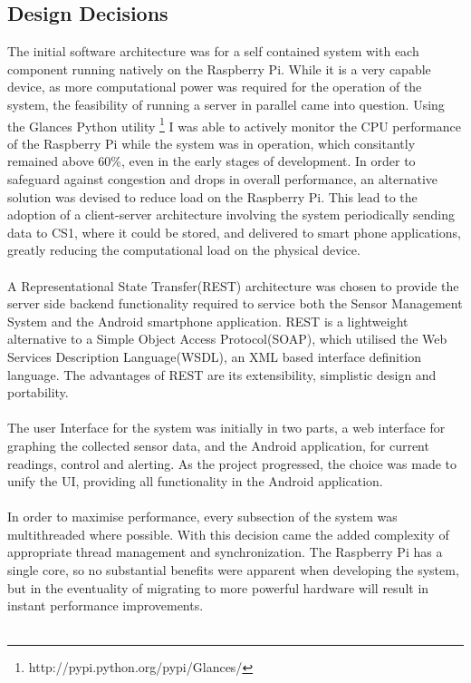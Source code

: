 \documentclass{article}
\begin{document}
\subsection{Design Decisions}
The initial software architecture was for a self contained system with each component running natively on the Raspberry Pi. While it is a very capable device, as more computational power was required for the operation of the system, the feasibility of running a server in parallel came into question. Using the Glances Python utility \footnote{http://pypi.python.org/pypi/Glances/} I was able to actively monitor the CPU performance of the Raspberry Pi while the system was in operation, which consitantly remained above 60\%, even in the early stages of development. In order to safeguard against congestion and drops in overall performance, an alternative solution was devised to reduce load on the Raspberry Pi. This lead to the adoption of a client-server architecture involving the system periodically sending data to CS1, where it could be stored, and delivered to smart phone applications, greatly reducing the computational load on the physical device. \\\\
A Representational State Transfer(REST) architecture was chosen to provide the server side backend functionality required to service both the Sensor Management System and the Android smartphone application.  REST is a lightweight alternative to a Simple Object Access Protocol(SOAP), which utilised the Web Services Description Language(WSDL), an XML based interface definition language. The advantages of REST are its extensibility, simplistic design and portability. \\\\
The user Interface for the system was initially in two parts, a web interface for graphing the collected sensor data, and the Android application, for current readings, control and alerting. As the project progressed, the choice was made to unify the UI, providing all functionality in the Android application.  \\\\
In order to maximise performance, every subsection of the system was multithreaded where possible. With this decision came the added complexity of appropriate thread management and synchronization. The Raspberry Pi has a single core, so no substantial benefits were apparent when developing the system, but in the eventuality of migrating to more powerful hardware will result in instant performance improvements. \\\\
\end{document}

